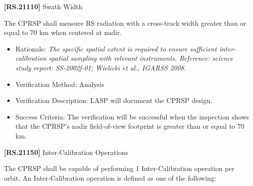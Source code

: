 \textbf{[RS.21110]} Swath Width

The \gls{CPRSP} shall \gls{measure} \gls{RS} radiation with a cross-track width greater than or equal to 70 km when centered at nadir.

\begin{itemize}
\item{} Rationale: \emph{The specific spatial extent is required to ensure sufficient inter-calibration spatial sampling with relevant instruments. Reference: science study report: SS-2002f-01; Wielicki et al., IGARSS 2008.}

\item{} Verification Method: Analysis

\item{} Verification Description: \gls{LASP} will document the \gls{CPRSP} design.

\item{} Success Criteria: The verification will be successful when the \gls{inspection} shows that the \gls{CPRSP}'s nadir field-of-view footprint is greater than or equal to 70 km.

\end{itemize}

\textbf{[RS.21150]} Inter-Calibration Operations

The \gls{CPRSP} shall be capable of performing 1 Inter-Calibration operation per orbit. An Inter-Calibration operation is defined as one of the following:

